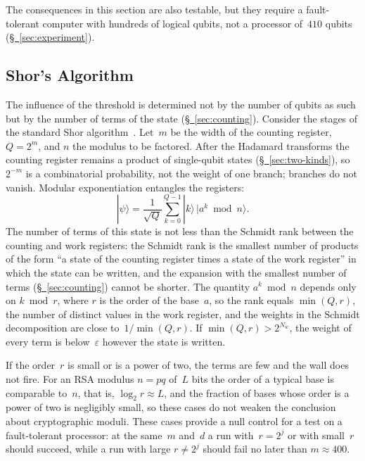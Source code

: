 \documentclass[11pt,a4paper]{article}
\begin{document}
The consequences in this section are also testable, but they require a fault-tolerant computer with hundreds of logical qubits, not a processor of~$410$ qubits (\hyperref[sec:experiment]{\S~\ref*{sec:experiment}}).

\subsection{Shor's Algorithm}
\label{sec:shor}

The influence of the threshold is determined not by the number of qubits as such but by the number of terms of the state (\hyperref[sec:counting]{\S~\ref*{sec:counting}}). Consider the stages of the standard Shor algorithm~\cite{shor1997}. Let~$m$ be the width of the counting register, $Q=2^m$, and $n$ the modulus to be factored. After the Hadamard transforms the counting register remains a product of single-qubit states (\hyperref[sec:two-kinds]{\S~\ref*{sec:two-kinds}}), so $2^{-m}$ is a combinatorial probability, not the weight of one branch; branches do not vanish. Modular exponentiation entangles the registers:
\begin{equation}
|\psi\rangle=\frac1{\sqrt Q}\sum_{k=0}^{Q-1}|k\rangle\,|a^k\bmod n\rangle.
\end{equation}
The number of terms of this state is not less than the Schmidt rank between the counting and work registers: the Schmidt rank is the smallest number of products of the form ``a state of the counting register times a state of the work register'' in which the state can be written, and the expansion with the smallest number of terms (\hyperref[sec:counting]{\S~\ref*{sec:counting}}) cannot be shorter. The quantity $a^k\bmod n$ depends only on $k\bmod r$, where $r$ is the order of the base~$a$, so the rank equals $\min(Q,r)$, the number of distinct values in the work register, and the weights in the Schmidt decomposition are close to~$1/\min(Q,r)$. If $\min(Q,r)>2^{N_w}$, the weight of every term is below~$\varepsilon$ however the state is written.

If the order~$r$ is small or is a power of two, the terms are few and the wall does not fire. For an RSA modulus $n=pq$ of~$L$ bits the order of a typical base is comparable to~$n$, that is, $\log_2 r\approx L$, and the fraction of bases whose order is a power of two is negligibly small, so these cases do not weaken the conclusion about cryptographic moduli. These cases provide a null control for a test on a fault-tolerant processor: at the same~$m$ and~$d$ a run with~$r=2^j$ or with small~$r$ should succeed, while a run with large $r\ne2^j$ should fail no later than $m\approx400$.
\end{document}
